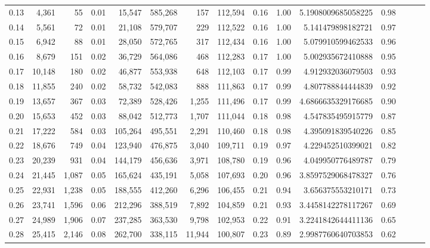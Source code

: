 \begin{tabular}{rrrrrrrrrrrrrrr}
0.13 &   4,361 &     55 &  0.01 &   15,547 &  585,268 &      157 &  112,594 &  0.16 &  1.00 &      5.1908009685058225 &      0.98 \\
0.14 &   5,561 &     72 &  0.01 &   21,108 &  579,707 &      229 &  112,522 &  0.16 &  1.00 &       5.141479898182721 &      0.97 \\
0.15 &   6,942 &     88 &  0.01 &   28,050 &  572,765 &      317 &  112,434 &  0.16 &  1.00 &       5.079910599462533 &      0.96 \\
0.16 &   8,679 &    151 &  0.02 &   36,729 &  564,086 &      468 &  112,283 &  0.17 &  1.00 &       5.002935672410888 &      0.95 \\
0.17 &  10,148 &    180 &  0.02 &   46,877 &  553,938 &      648 &  112,103 &  0.17 &  0.99 &       4.912932036079503 &      0.93 \\
0.18 &  11,855 &    240 &  0.02 &   58,732 &  542,083 &      888 &  111,863 &  0.17 &  0.99 &       4.807788844444839 &      0.92 \\
0.19 &  13,657 &    367 &  0.03 &   72,389 &  528,426 &    1,255 &  111,496 &  0.17 &  0.99 &      4.6866635329176685 &      0.90 \\
0.20 &  15,653 &    452 &  0.03 &   88,042 &  512,773 &    1,707 &  111,044 &  0.18 &  0.98 &       4.547835495915779 &      0.87 \\
0.21 &  17,222 &    584 &  0.03 &  105,264 &  495,551 &    2,291 &  110,460 &  0.18 &  0.98 &       4.395091839540226 &      0.85 \\
0.22 &  18,676 &    749 &  0.04 &  123,940 &  476,875 &    3,040 &  109,711 &  0.19 &  0.97 &       4.229452510399021 &      0.82 \\
0.23 &  20,239 &    931 &  0.04 &  144,179 &  456,636 &    3,971 &  108,780 &  0.19 &  0.96 &       4.049950776489787 &      0.79 \\
0.24 &  21,445 &  1,087 &  0.05 &  165,624 &  435,191 &    5,058 &  107,693 &  0.20 &  0.96 &      3.8597529068478327 &      0.76 \\
0.25 &  22,931 &  1,238 &  0.05 &  188,555 &  412,260 &    6,296 &  106,455 &  0.21 &  0.94 &       3.656375553210171 &      0.73 \\
0.26 &  23,741 &  1,596 &  0.06 &  212,296 &  388,519 &    7,892 &  104,859 &  0.21 &  0.93 &      3.4458142278117267 &      0.69 \\
0.27 &  24,989 &  1,906 &  0.07 &  237,285 &  363,530 &    9,798 &  102,953 &  0.22 &  0.91 &      3.2241842644411136 &      0.65 \\
0.28 &  25,415 &  2,146 &  0.08 &  262,700 &  338,115 &   11,944 &  100,807 &  0.23 &  0.89 &      2.9987760640703853 &      0.62 \\

\end{tabular}
